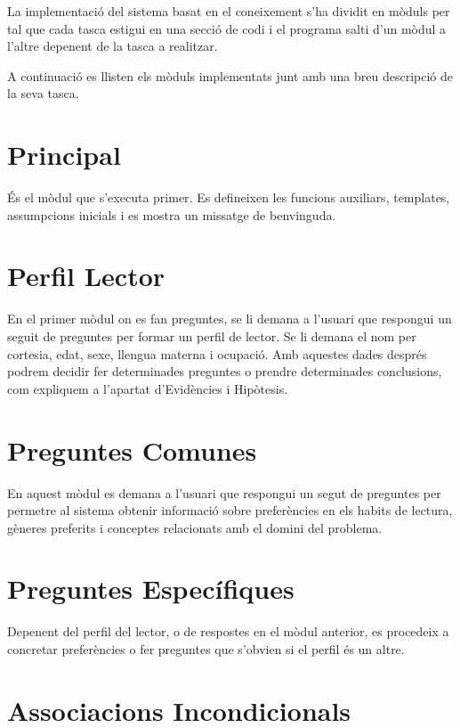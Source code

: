 \label{moduls}

La implementació del sistema basat en el coneixement s'ha dividit en mòduls per tal que cada tasca estigui en una secció de codi i el programa salti d'un mòdul a l'altre depenent de la tasca a realitzar.

A continuació es llisten els mòduls implementats junt amb una breu descripció de la seva tasca.

\section{Principal}

És el mòdul que s'executa primer. Es defineixen les funcions auxiliars, templates, assumpcions inicials i es mostra un missatge de benvinguda.

\section{Perfil Lector}

En el primer mòdul on es fan preguntes, se li demana a l'usuari que respongui un seguit de preguntes per formar un perfil de lector. Se li demana el nom per cortesia, edat, sexe, llengua materna i ocupació. Amb aquestes dades després podrem decidir fer determinades preguntes o prendre determinades conclusions, com expliquem a l'apartat d'Evidències i Hipòtesis.


\section{Preguntes Comunes}

En aquest mòdul es demana a l'usuari que respongui un segut de preguntes per permetre al sistema obtenir informació sobre preferències en els habits de lectura, gèneres preferits i conceptes relacionats amb el domini del problema.

\section{Preguntes Específiques}

Depenent del perfil del lector, o de respostes en el mòdul anterior, es procedeix a concretar preferències o fer preguntes que s'obvien si el perfil és un altre.

\section{Associacions Incondicionals}

